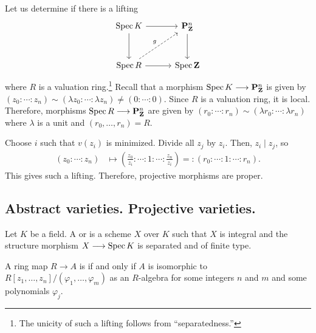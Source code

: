 \documentclass [11 pt, oneside] {article}
\begin{document}
Let us determine if there is a lifting
\[
\begin{tikzcd}[row sep = 3 em, column sep = 3 em]
	\Spec K \ar[r]\ar[d] & \mathbf{P}^n_{\mathbf{Z}}\ar[d] \\ \Spec R \ar[r]\ar[ur,dashed,"g"] &\Spec \mathbf{Z}
\end{tikzcd}
\]
where $R$ is a valuation ring.\footnote{The unicity of such a lifting follows from ``separatedness.''} Recall that a morphism $\operatorname{Spec} K \longrightarrow \mathbf{P}^n_{\mathbf{Z}}$ is given by $(z_0:\cdots:z_n)\sim (\lambda z_0 : \cdots :\lambda z_n)\ne(0:\cdots:0)$. Since $R$ is a valuation ring, it is local. Therefore, morphisms $\operatorname{Spec} R\longrightarrow \mathbf{P}^n_{\mathbf{Z}}$ are given by $(r_0:\cdots:r_n)\sim(\lambda r_0:\cdots: \lambda r_n)$ where $\lambda$ is a unit and $(r_0,\hdots, r_n)= R$.

Choose $i$ such that $v(z_i)$ is minimized. Divide all $z_j$ by $z_i$. Then, $z_i \mid z_j$, so
\begin{align*}
	(z_0:\cdots:z_n)&\longmapsto \left( \frac{z_0}{z_i} : \cdots : 1 : \cdots: \frac{z_n}{z_i} \right) =: (r_0:\cdots:1:\cdots:r_n).
\end{align*}
This gives such a lifting. Therefore, projective morphisms are proper.

\subsection{Abstract varieties. Projective varieties.}

\begin{definition}\label{}\text{}
Let $K$ be a field. A  or  is a scheme $X$ over $K$ such that $X$ is integral and the structure morphism $X\longrightarrow \operatorname{Spec} K$ is separated and of finite type.
\end{definition}

\begin{definition}[ ]\label{}\text{}
A ring map $R\longrightarrow A$ is  if and only if $A$ is isomorphic to $R[z_1,\hdots,z_n]/(\varphi_1,\hdots,\varphi_m)$ as an $R$-algebra for some integers $n$ and $m$ and some polynomials $\varphi_j$.
\end{definition}
\end{document}
